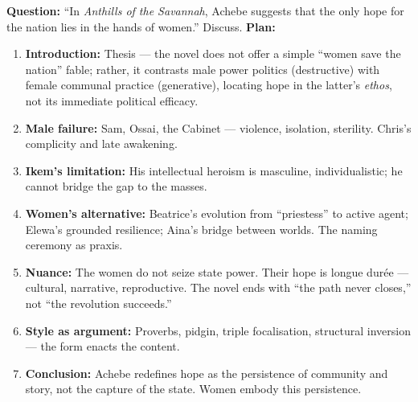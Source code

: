 \documentclass[11pt]{article}
\newcommand{\cle}[1]{{\popxbold\color{popdark}#1}}
\begin{document}
\begin{exemplebox}
\textbf{Question:} “In \emph{Anthills of the Savannah}, Achebe suggests that the only hope for the nation lies in the hands of women.” Discuss.
\textbf{Plan:}
\begin{enumerate}
\item \textbf{Introduction:} Thesis — the novel does not offer a simple “women save the nation” fable; rather, it contrasts male power politics (destructive) with female communal practice (generative), locating hope in the latter’s \emph{ethos}, not its immediate political efficacy.
\item \textbf{Male failure:} Sam, Ossai, the Cabinet — violence, isolation, sterility. Chris’s complicity and late awakening.
\item \textbf{Ikem’s limitation:} His intellectual heroism is masculine, individualistic; he cannot bridge the gap to the masses.
\item \textbf{Women’s alternative:} Beatrice’s evolution from “priestess” to active agent; Elewa’s grounded resilience; Aina’s bridge between worlds. The naming ceremony as praxis.
\item \textbf{Nuance:} The women do not seize state power. Their hope is \cle{longue durée} — cultural, narrative, reproductive. The novel ends with “the path never closes,” not “the revolution succeeds.”
\item \textbf{Style as argument:} Proverbs, pidgin, triple focalisation, structural inversion — the form enacts the content.
\item \textbf{Conclusion:} Achebe redefines hope as the persistence of community and story, not the capture of the state. Women embody this persistence.
\end{enumerate}
\end{exemplebox}
\end{document}

